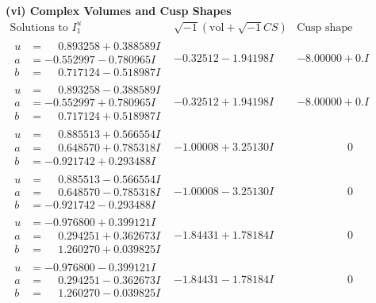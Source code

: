 \documentclass[1p]{elsarticle_modified}
\theoremstyle{definition}
\newcommand{\I}{\sqrt{-1}}
\begin{document}
\newpage\flushleft \textbf{(vi) Complex Volumes and Cusp Shapes}
$$\begin{array}{c|c|c}  
\text{Solutions to }I^u_{1}& \I (\text{vol} + \sqrt{-1}CS) & \text{Cusp shape}\\
 \hline 
\begin{aligned}
u &= \phantom{-}0.893258 + 0.388589 I \\
a &= -0.552997 - 0.780965 I \\
b &= \phantom{-}0.717124 - 0.518987 I\end{aligned}
 & -0.32512 - 1.94198 I & -8.00000 + 0. I\phantom{ +0.000000I} \\ \hline\begin{aligned}
u &= \phantom{-}0.893258 - 0.388589 I \\
a &= -0.552997 + 0.780965 I \\
b &= \phantom{-}0.717124 + 0.518987 I\end{aligned}
 & -0.32512 + 1.94198 I & -8.00000 + 0. I\phantom{ +0.000000I} \\ \hline\begin{aligned}
u &= \phantom{-}0.885513 + 0.566554 I \\
a &= \phantom{-}0.648570 + 0.785318 I \\
b &= -0.921742 + 0.293488 I\end{aligned}
 & -1.00008 + 3.25130 I & \phantom{-0.000000 } 0 \\ \hline\begin{aligned}
u &= \phantom{-}0.885513 - 0.566554 I \\
a &= \phantom{-}0.648570 - 0.785318 I \\
b &= -0.921742 - 0.293488 I\end{aligned}
 & -1.00008 - 3.25130 I & \phantom{-0.000000 } 0 \\ \hline\begin{aligned}
u &= -0.976800 + 0.399121 I \\
a &= \phantom{-}0.294251 + 0.362673 I \\
b &= \phantom{-}1.260270 + 0.039825 I\end{aligned}
 & -1.84431 + 1.78184 I & \phantom{-0.000000 } 0 \\ \hline\begin{aligned}
u &= -0.976800 - 0.399121 I \\
a &= \phantom{-}0.294251 - 0.362673 I \\
b &= \phantom{-}1.260270 - 0.039825 I\end{aligned}
 & -1.84431 - 1.78184 I & \phantom{-0.000000 } 0 \\ \hline\begin{aligned}

\end{aligned}
\end{array}$$
\end{document}
